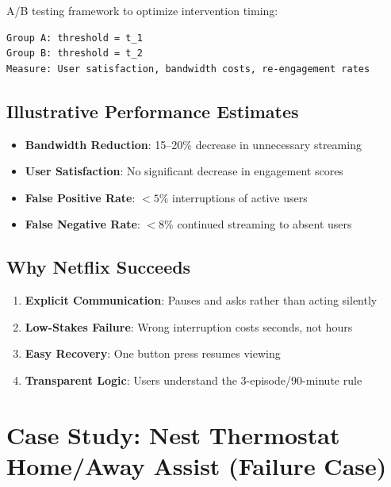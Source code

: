 A/B testing framework to optimize intervention timing:
\begin{lstlisting}[language={}, caption={Netflix A/B testing framework}]
Group A: threshold = t_1
Group B: threshold = t_2
Measure: User satisfaction, bandwidth costs, re-engagement rates
\end{lstlisting}

\subsection{Illustrative Performance Estimates}

\begin{technote}
\begin{itemize}
    \item \textbf{Bandwidth Reduction}: 15--20\% decrease in unnecessary streaming
    \item \textbf{User Satisfaction}: No significant decrease in engagement scores
    \item \textbf{False Positive Rate}: ${<}5\%$ interruptions of active users
    \item \textbf{False Negative Rate}: ${<}8\%$ continued streaming to absent users
\end{itemize}
\end{technote}

\subsection{Why Netflix Succeeds}

\begin{examplebox}
\begin{enumerate}
    \item \textbf{Explicit Communication}: Pauses and asks rather than acting silently
    \item \textbf{Low-Stakes Failure}: Wrong interruption costs seconds, not hours
    \item \textbf{Easy Recovery}: One button press resumes viewing
    \item \textbf{Transparent Logic}: Users understand the 3-episode/90-minute rule
\end{enumerate}
\end{examplebox}

\section{Case Study: Nest Thermostat Home/Away Assist (Failure Case)}


